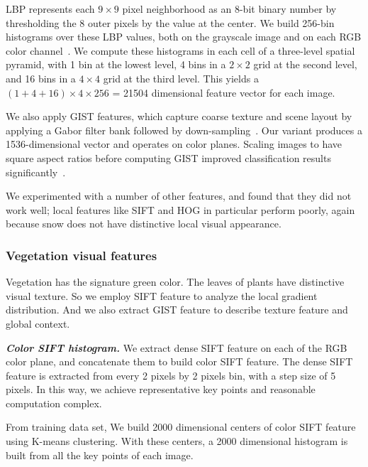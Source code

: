 \documentclass[10pt,journal,compsoc]{IEEEtran}
\begin{document}
 LBP represents each $9 \times 9$ pixel neighborhood 
as an 8-bit binary number by thresholding the 8 outer pixels
by the value at the center.  We build 256-bin histograms over
these LBP values, both on the grayscale image and on each RGB color
channel~\cite{korayem2012solving}. We compute these histograms in each cell of a three-level spatial
pyramid, with 1 bin at the lowest level, 4 bins in a $2 \times 2$ grid
at the second level, and 16 bins in a $4 \times 4$ grid at the third level.
This yields a $(1+4+16) \times 4 \times 256$ = 21504 dimensional feature
vector for each image.

 We also apply GIST features, which capture coarse texture
and scene layout by applying a Gabor filter bank followed by
down-sampling~\cite{oliva2001modeling}. Our variant produces a
1536-dimensional  vector and operates on color planes. Scaling
images to have square aspect ratios before computing GIST improved
classification results significantly~\cite{douze2009evaluation}.


We experimented with a number of other features, and found
that they did not work well; local features like SIFT and HOG in
particular perform poorly, again because snow does not have
distinctive local visual appearance. 

\subsubsection{Vegetation visual features}

Vegetation has the signature green color. 
The leaves of plants have distinctive visual texture. 
So we employ SIFT feature to analyze the local gradient distribution. 
And we also extract GIST feature to describe texture feature and global context. 





\textbf{\textit{Color SIFT histogram.}}
We extract dense SIFT feature on each of the RGB color plane, and concatenate them to build color SIFT feature. The dense SIFT feature is extracted from every 2 pixels by 2 pixels bin, with a step size of 5 pixels. In this way, we achieve representative key points and reasonable computation complex. 

From training data set, We build 2000 dimensional centers of color SIFT feature using K-means clustering. With these centers, a 2000 dimensional histogram is built from all the key points of each image.
\end{document}
